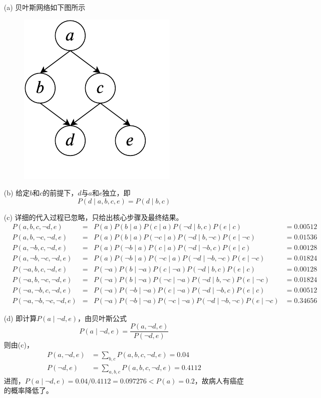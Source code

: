 \documentclass[a4paper, 11pt]{article}
\begin{document}
\begin{answer}
\begin{itemize}
    \item [(a)] 贝叶斯网络如下图所示
\begin{figure}[H]
\centering
\includegraphics[width=0.2\linewidth]{fig/T03-Q3-A.pdf}
\end{figure}
    \item [(b)] 给定$b$和$c$的前提下，$d$与$a$和$e$独立，即
    \[P(d\mid a,b,c,e)=P(d\mid b,c)\]
    \item [(c)] 详细的代入过程已忽略，只给出核心步骤及最终结果。
    \[\begin{aligned}
        &P(a,b,c,\lnot d,e) &=& P(a) P(b\mid a) P(c\mid a) P(\lnot d\mid b,c) P(e\mid c) &= 0.00512\\
        &P(a,b,\lnot c,\lnot d,e) &=& P(a) P(b\mid a) P(\lnot c\mid a) P(\lnot d\mid b,\lnot c) P(e\mid \lnot c) &= 0.01536\\
        &P(a,\lnot b,c,\lnot d,e) &=& P(a) P(\lnot b\mid a) P(c\mid a) P(\lnot d\mid \lnot b,c) P(e\mid c) &= 0.00128\\
        &P(a,\lnot b,\lnot c,\lnot d,e) &=& P(a) P(\lnot b\mid a) P(\lnot c\mid a) P(\lnot d\mid \lnot b,\lnot c) P(e\mid \lnot c) &= 0.01824\\
        &P(\lnot a,b,c,\lnot d,e) &=& P(\lnot a) P(b\mid \lnot a) P(c\mid \lnot a) P(\lnot d\mid b,c) P(e\mid c) &= 0.00128\\
        &P(\lnot a,b,\lnot c,\lnot d,e) &=& P(\lnot a) P(b\mid \lnot a) P(\lnot c\mid \lnot a) P(\lnot d\mid b,\lnot c) P(e\mid \lnot c) &= 0.01824\\
        &P(\lnot a,\lnot b,c,\lnot d,e) &=& P(\lnot a) P(\lnot b\mid \lnot a) P(c\mid \lnot a) P(\lnot d\mid \lnot b,c) P(e\mid c) &= 0.00512\\
        &P(\lnot a,\lnot b,\lnot c,\lnot d,e) &=& P(\lnot a) P(\lnot b\mid \lnot a) P(\lnot c\mid \lnot a) P(\lnot d\mid \lnot b,\lnot c) P(e\mid \lnot c) &= 0.34656
    \end{aligned}\]
    \item [(d)] 即计算$P(a\mid\lnot d,e)$，由贝叶斯公式
    \[P(a\mid\lnot d,e)=\frac{P(a,\lnot d,e)}{P(\lnot d,e)}\]
    则由(c)，
    \[\begin{aligned}
        P(a,\lnot d,e)&=\sum_{b,c} P(a,b,c,\lnot d,e)=0.04\\
        P(\lnot d,e)&=\sum_{a,b,c} P(a,b,c,\lnot d,e)=0.4112
    \end{aligned}\]
    进而，$P(a\mid\lnot d,e)=0.04/0.4112=0.097276<P(a)=0.2$，故病人有癌症的概率降低了。
\end{itemize}
\end{answer}
\end{document}
